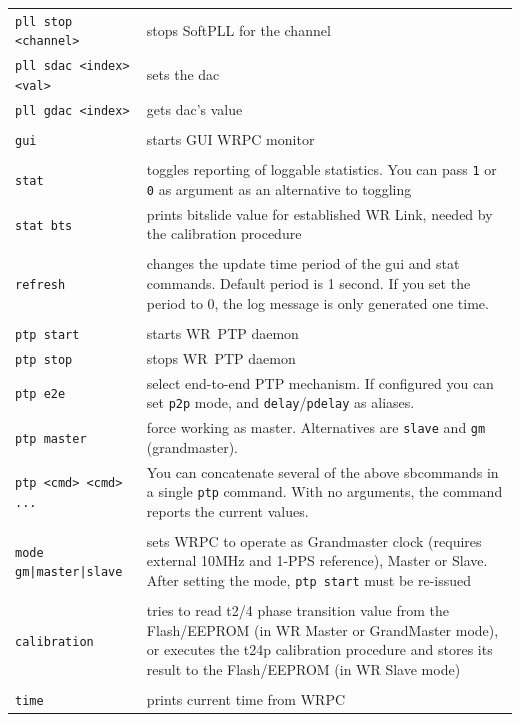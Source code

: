 \documentclass[a4paper, 12pt]{article}
\newcommand{\code}[1]{\texttt{#1}}
\newcommand{\codeHook}[1]{\mbox{\ttfamily\MakeTextUppercase{#1}}}
\begin{document}
\begin{longtable}{  p{7.5cm}  p{7cm} }
  \code{pll stop <channel>} & stops SoftPLL for the channel\\

  \code{pll sdac <index> <val>} & sets the dac\\

  \code{pll gdac <index>} & gets dac's value\\
 & \\
  \code{gui} & starts GUI \codeHook{wrpc} monitor\\
 & \\
  \code{stat} & toggles reporting of loggable statistics. You can pass
\texttt{1} or \texttt{0} as argument as an alternative to toggling\\

  \code{stat bts} & prints bitslide value for established \codeHook{wr} Link,
needed by the calibration procedure\\
 & \\
  \code{refresh} & changes the update time period of the gui and stat
commands. Default period is 1 second. If you set the period to 0, the log
message is only generated one time.\\
 & \\
  \code{ptp start} & starts \codeHook{wr ptp} daemon\\

  \code{ptp stop} & stops \codeHook{wr ptp} daemon\\

  \code{ptp e2e} & select end-to-end PTP mechanism. If configured you can set \texttt{p2p} mode, and \texttt{delay}/\texttt{pdelay} as aliases.\\

  \code{ptp master} & force working as master. Alternatives are \texttt{slave} and \texttt{gm} (grandmaster).\\

  \code{ptp <cmd> <cmd> ...} & You can concatenate several of the above sbcommands in a single \texttt{ptp} command. With no arguments, the command reports the current values.\\
 & \\
  \code{mode gm|master|slave} & sets \codeHook{wrpc} to operate as Grandmaster
clock (requires external 10MHz and 1-PPS reference), Master or Slave. After
setting the mode, \texttt{ptp start} must be re-issued\\
 & \\
  \code{calibration} & tries to read t2/4 phase transition value from the
Flash/EEPROM (in \codeHook{wr} Master or GrandMaster mode), or executes the t24p
calibration procedure and stores its result to the Flash/EEPROM (in \codeHook{wr}
Slave mode)\\
 & \\
  \code{time} & prints current time from \codeHook{wrpc}\\


\end{longtable}
\end{document}
